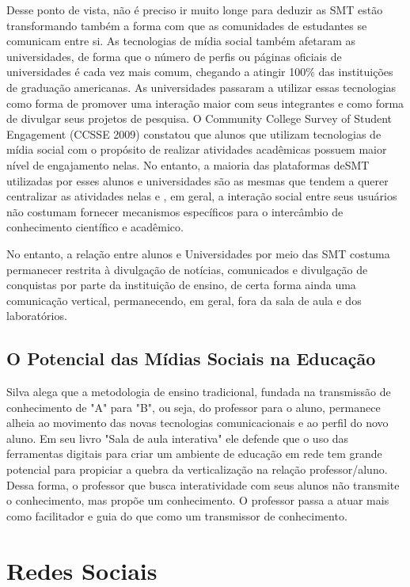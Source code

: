 Desse ponto de vista, não é preciso ir muito longe para deduzir as SMT estão
transformando também a forma com que as comunidades de estudantes se comunicam
entre si. As tecnologias de mídia social também afetaram as universidades, de
forma que o número de perfis ou páginas oficiais de universidades é cada vez mais
comum, chegando a atingir 100\% das instituições de graduação americanas. As
universidades passaram a utilizar essas tecnologias como forma de promover uma
interação maior com seus integrantes e como forma de divulgar seus projetos de
pesquisa. O Community College Survey of Student Engagement (CCSSE 2009) constatou
que alunos que utilizam tecnologias de mídia social com o propósito de realizar
atividades acadêmicas possuem maior nível de engajamento nelas. No entanto, a
maioria das plataformas deSMT utilizadas por esses alunos e universidades são as
mesmas que tendem a querer centralizar as atividades nelas e , em geral, a interação
social entre seus usuários não costumam fornecer mecanismos específicos para o
intercâmbio de conhecimento científico e acadêmico.

No entanto, a relação entre alunos e Universidades por meio das SMT costuma permanecer
restrita à divulgação de notícias, comunicados e divulgação de conquistas por parte
da instituição de ensino, de certa forma ainda uma comunicação vertical, permanecendo,
em geral, fora da sala de aula e dos laboratórios.

\subsection{O Potencial das Mídias Sociais na Educação}

Silva \cite{silva} alega que a metodologia de ensino tradicional, fundada na
transmissão de conhecimento de "A" para "B", ou seja, do professor para o aluno,
permanece alheia ao movimento das novas tecnologias comunicacionais e ao perfil
do novo aluno. Em seu livro "Sala de aula interativa"
ele defende que o uso das ferramentas digitais para criar um ambiente de educação
em rede tem grande potencial para propiciar a quebra da verticalização na relação
professor/aluno. Dessa forma, o professor que busca interatividade com seus alunos
não transmite o conhecimento, mas propõe um conhecimento. O professor passa a
atuar mais como facilitador e guia do que como um transmissor de conhecimento.



\section{Redes Sociais}

